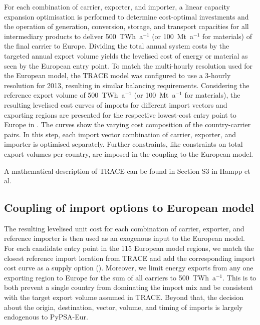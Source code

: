 For each combination of carrier, exporter, and importer, a linear capacity
expansion optimisation is performed to determine cost-optimal investments and
the operation of generation, conversion, storage, and transport capacities for
all intermediary products to deliver 500~TWh~a$^{-1}$ (or 100~Mt~a$^{-1}$ for
materials) of the final carrier to Europe. Dividing the total annual system
costs by the targeted annual export volume yields the levelised cost of energy
or material as seen by the European entry point. To match the multi-hourly
resolution used for the European model, the TRACE model was configured to use a
3-hourly resolution for 2013, resulting in similar balancing requirements.
Considering the reference export volume of 500~TWh~a$^{-1}$ (or 100~Mt~a$^{-1}$
for materials), the resulting levelised cost curves of imports for different
import vectors and exporting regions are presented for the respective
lowest-cost entry point to Europe in
.
The curves show the varying cost composition of the country-carrier pairs. In
this step, each import vector combination of carrier, exporter, and importer is
optimised separately. Further constraints, like constraints on total export
volumes per country, are imposed in the coupling to the European model.

A mathematical description of TRACE can be found in Section S3 in Hampp et
al.\cite{hamppImportOptions2023}

\subsection*{Coupling of import options to European model}

The resulting levelised unit cost for each combination of carrier, exporter, and
reference importer is then used as an exogenous input to the European model. For
each candidate entry point in the 115 European model regions, we match the
closest reference import location from TRACE and add the corresponding import
cost curve as a supply option
().
Moreover, we limit energy exports from any one exporting region to Europe for
the sum of all carriers to 500~TWh~a$^{-1}$. This is to both prevent a single
country from dominating the import mix and be consistent with the target export
volume assumed in TRACE. Beyond that, the decision about the origin,
destination, vector, volume, and timing of imports is largely endogenous to
PyPSA-Eur.

